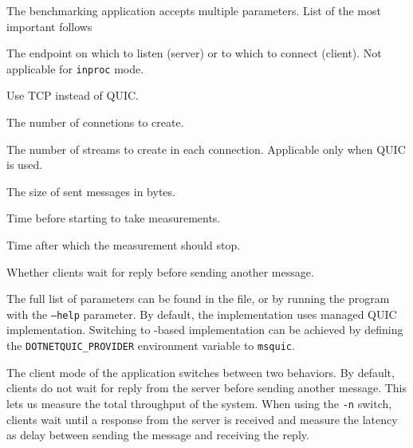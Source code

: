 The benchmarking application accepts multiple parameters. List of the most important follows

\begin{description}

     The endpoint on which to listen (server) or to which to connect (client). Not applicable for \texttt{inproc} mode.



     Use TCP instead of QUIC\@.

     The number of connetions to create.

     The number of streams to create in each connection. Applicable only when QUIC is used.

     The size of sent messages in bytes.

     Time before starting to take measurements.

     Time after which the measurement should stop.


     Whether clients wait for reply before sending another message.

\end{description}

The full list of parameters can be found in the  file, or by running the
program with the \texttt{--help} parameter. By default, the implementation uses managed QUIC
implementation. Switching to \libmsquic{}-based implementation can be achieved by defining the
\texttt{DOTNETQUIC_PROVIDER} environment variable to \texttt{msquic}.

The client mode of the application switches between two behaviors. By default, clients do not wait
for reply from the server before sending another message. This lets us measure the total throughput
of the system. When using the \texttt{-n} switch, clients wait until a response from the server is
received and measure the latency as delay between sending the message and receiving the reply.


